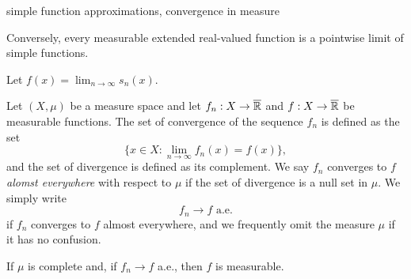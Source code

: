 \documentclass{../../large}
\begin{document}
simple function approximations, convergence in measure

\begin{prb}

Conversely, every measurable extended real-valued function is a pointwise limit of simple functions.

\end{prb}
\begin{pf}
Let $f(x)=\lim_{n\to\infty}s_n(x)$.

\end{pf}



\begin{prb}
Let $(X,\mu)$ be a measure space and let $f_n:X\to\overline{\mathbb{R}}$ and $f:X\to\overline{\mathbb{R}}$ be measurable functions.
The set of convergence of the sequence $f_n$ is defined as the set
\[\{x\in X:\lim_{n\to\infty}f_n(x)=f(x)\},\]
and the set of divergence is defined as its complement.
We say $f_n$ converges to $f$ \emph{alomst everywhere} with respect to $\mu$ if the set of divergence is a null set in $\mu$.
We simply write
\[f_n\to f\text{ a.e.}\]
if $f_n$ converges to $f$ almost everywhere, and we frequently omit the measure $\mu$ if it has no confusion.
\begin{parts}
\item If $\mu$ is complete and, if $f_n\to f$ a.e., then $f$ is measurable.
\end{parts}
\end{prb}
\end{document}
